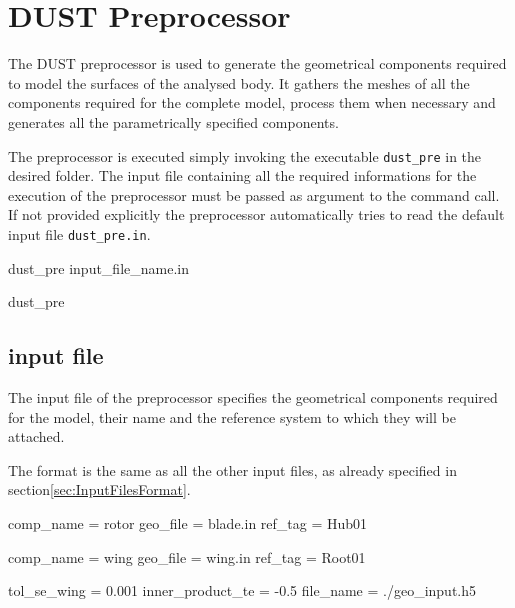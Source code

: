\chapter{DUST Preprocessor}
\label{ch:Pre}

The DUST preprocessor is used to generate the geometrical components required to model the surfaces of the analysed body. It gathers the meshes of all the components required for the complete model, process them when necessary and generates all the parametrically specified components. 

The preprocessor is executed simply invoking the executable \texttt{dust\_pre} in the desired folder. The input file containing all the required informations for the execution of the preprocessor must be passed as argument to the command call. If not provided explicitly the preprocessor automatically tries to read the default input file \texttt{dust\_pre.in}.
\begin{command}[caption={Preprocessor command looking for input file \texttt{input\_file\_name.in}}]
 dust_pre input_file_name.in
\end{command}

\begin{command}[caption={Preprocessor command looking for 
default input file \texttt{dust\_pre.in}}, label={command:dus_pre_default}]
 dust_pre
\end{command}


\section{input file}
\label{sec:Pre_InputFile}

The input file of the preprocessor specifies the geometrical components required for the model, their name and the reference system to which they will be attached.

The format is the same as all the other input files, as already specified in section\ref{sec:InputFilesFormat}.

\begin{inputfile}[frame=single, caption={dust\_pre.in}, label={file:dust_pre.in}]
comp_name = rotor
geo_file  = blade.in
ref_tag   = Hub01

comp_name = wing
geo_file  = wing.in
ref_tag   = Root01

tol_se_wing  = 0.001
inner_product_te = -0.5
file_name = ./geo_input.h5 
\end{inputfile}

